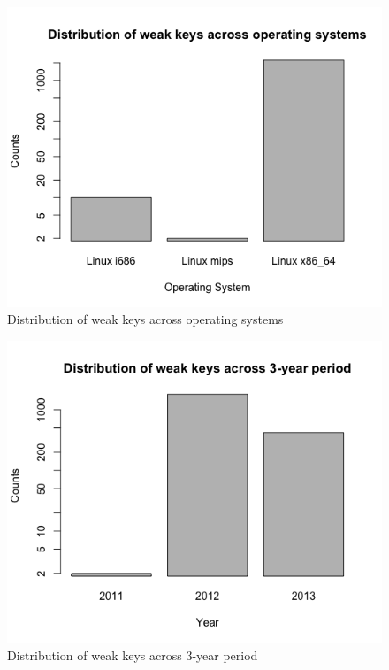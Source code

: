\begin{figure}[h]
\centering
\includegraphics[width=\linewidth]{distribution-across-OS.png}
\caption{Distribution of weak keys across operating systems}
\label{dist-across-os}
\end{figure}


\begin{figure}[h]
\centering
\includegraphics[width=\linewidth]{distribution-over-3-years.png}
\caption{Distribution of weak keys across 3-year period}
\label{dist-3-yrs}
\end{figure}

